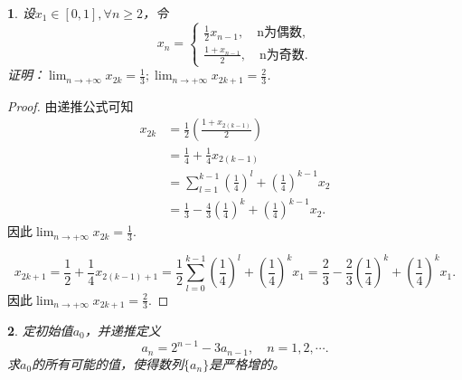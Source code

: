 \documentclass[utf8]{book}
\newtheorem{example}{}[section]             %
\begin{document}
\begin{example}
设$x_1\in[0,1], \forall n\geq 2$，令
\begin{equation*}
x_n =
\begin{cases}
\frac{1}{2}x_{n-1}, \quad \text{n为偶数,}\\
\frac{1+x_{n-1}}{2},\quad\text{n为奇数.}
\end{cases}
\end{equation*}
证明：$\displaystyle\lim_{n\to +\infty}x_{2k}=\frac{1}{3};\displaystyle\lim_{n\to +\infty}x_{2k+1}=\frac{2}{3}$.
\end{example}
\begin{proof}
由递推公式可知
\begin{equation*}
\begin{split}
x_{2k} &= \frac{1}{2}\left(\frac{1+x_{2(k-1)}}{2}\right)\\&=\frac{1}{4}+\frac{1}{4}x_{2(k-1)}\\&= \displaystyle\sum_{l=1}^{k-1}\left(\frac{1}{4}\right)^l+\left(\frac{1}{4}\right)^{k-1}x_2 \\&= \frac{1}{3}-\frac{4}{3}\left(\frac{1}{4}\right)^k+\left(\frac{1}{4}\right)^{k-1}x_2.
\end{split}
\end{equation*}
因此$\displaystyle\lim_{n\to +\infty}x_{2k}=\frac{1}{3}$.

$$x_{2k+1}=\frac{1}{2}+\frac{1}{4}x_{2(k-1)+1}
=\frac{1}{2}\displaystyle\sum_{l=0}^{k-1}\left(\frac{1}{4}\right)^{l} + \left(\frac{1}{4}\right)^{k}x_1
=\frac{2}{3}-\frac{2}{3}\left(\frac{1}{4}\right)^{k}+\left(\frac{1}{4}\right)^{k}x_1.$$
因此$\displaystyle\lim_{n\to +\infty}x_{2k+1}=\frac{2}{3}$.
\end{proof}
\begin{example}
定初始值$a_0$，并递推定义$$a_n=2^{n-1}-3a_{n-1},\quad n=1,2,\cdots.$$
求$a_0$的所有可能的值，使得数列$\{a_n\}$是严格增的。
\end{example}
\end{document}
